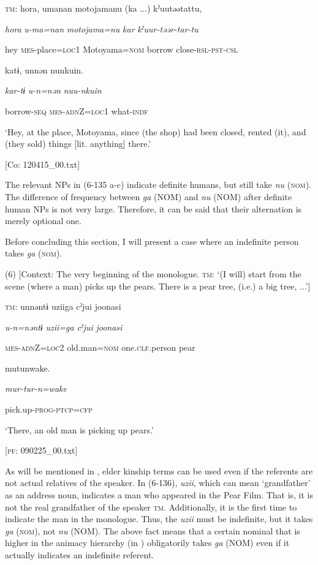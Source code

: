     \textsc{tm}:  {\textbar}hora{\textbar},  umanan  motojamanu  (ka ...)  kˀuutəətattu,

      \textit{hora}  \textit{u-ma=nan}  \textit{motojama=nu}  \textit{kar}  \textit{kˀuur-təər-tar-tu}

      hey  \textsc{mes}-place=\textsc{loc}1  Motoyama=\textsc{nom}  borrow  close-\textsc{rsl}-\textsc{pst}-\textsc{csl}

      katɨ,  unnən  nunkuin.

      \textit{kar-tɨ}  \textit{u-n=nən}  \textit{nuu-nkuin}

      borrow-\textsc{seq}  \textsc{mes}-\textsc{adn}Z=\textsc{loc}1  what-\textsc{indf}

      ‘Hey, at the place, Motoyama, since (the shop) had been closed, rented (it), and (they sold) things [lit. anything] there.’

      [Co: 120415\_00.txt]

The relevant NPs in (6-135 a-c) indicate definite humans, but still take \textit{nu} (\textsc{nom}). The difference of frequency between \textit{ga} (NOM) and \textit{nu} (NOM) after definite human NPs is not very large. Therefore, it can be said that their alternation is merely optional one.

  Before concluding this section, I will present a case where an indefinite person takes \textit{ga} (\textsc{nom}).

(6)  [Context: The very beginning of the monologue. \textsc{tm}: ‘(I will) start from the scene (where a man) picks up the pears. There is a pear tree, (i.e.) a big tree, ...’]

  \textsc{tm}:  unnəntɨ  uziiga  cˀjui  joonasi

    \textit{u-n=nəntɨ}  \textit{uzii=ga}  \textit{cˀjui}  \textit{joonasi}

    \textsc{mes}-\textsc{adn}Z=\textsc{loc}2  old.man=\textsc{nom}  one.\textsc{clf}.person  pear

    mutunwake.

    \textit{mur-tur-n=wake}

    pick.up-\textsc{prog}-\textsc{ptcp}=\textsc{cfp}

    ‘There, an old man is picking up pears.’

    [\textsc{pf}: 090225\_00.txt]

As will be mentioned in , elder kinship terms can be used even if the referents are not actual relatives of the speaker. In (6-136), \textit{uzii}, which can mean ‘grandfather’ as an address noun, indicates a man who appeared in the Pear Film. That is, it is not the real grandfather of the speaker \textsc{tm}. Additionally, it is the first time to indicate the man in the monologue. Thus, the \textit{uzii} must be indefinite, but it takes \textit{ga} (\textsc{nom}), not \textit{nu} (NOM). The above fact means that a certain nominal that is higher in the animacy hierarchy (in ) obligatorily takes \textit{ga} (NOM) even if it actually indicates an indefinite referent.

